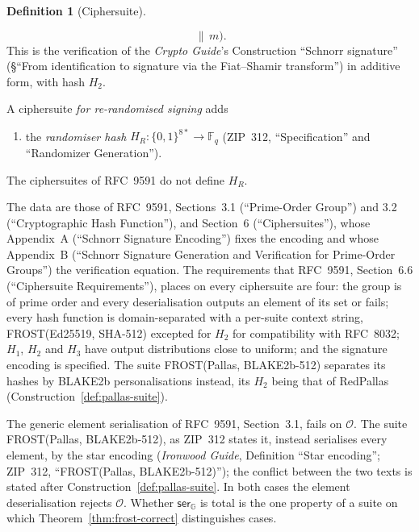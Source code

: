 \documentclass[11pt,a4paper]{article}
\theoremstyle{definition}
\newtheorem{definition}[theorem]{Definition}
\newcommand{\F}{\mathbb{F}}
\newcommand{\G}{\mathbb{G}}
\newcommand{\Fq}{\F_q}
\begin{document}
\begin{definition}[Ciphersuite]
\begin{enumerate}
\[      \,\|\, m\bigr) .
  \]
  This is the verification of the \emph{Crypto Guide}'s Construction
  ``Schnorr signature'' (\S``From identification to signature via the
  Fiat--Shamir transform'') in additive form, with hash \(H_2\).
\end{enumerate}
A ciphersuite \emph{for re-randomised signing} adds
\begin{enumerate}
\item[(f)] the \emph{randomiser hash} \(H_R \colon \{0,1\}^{8*} \to \Fq\)
  (ZIP~312, ``Specification'' and ``Randomizer Generation'').
\end{enumerate}
The ciphersuites of RFC~9591 do not define \(H_R\).
\end{definition}

The data are those of RFC~9591, Sections~3.1 (``Prime-Order Group'') and
3.2 (``Cryptographic Hash Function''), and Section~6 (``Ciphersuites''),
whose Appendix~A (``Schnorr Signature Encoding'') fixes the encoding and
whose Appendix~B (``Schnorr Signature Generation and Verification for
Prime-Order Groups'') the verification equation. The requirements that
RFC~9591, Section~6.6 (``Ciphersuite Requirements''), places on every
ciphersuite are four: the group is of prime order and every deserialisation
outputs an element of its set or fails; every hash function is
domain-separated with a per-suite context string, FROST(Ed25519, SHA-512)
excepted for \(H_2\) for compatibility with RFC~8032; \(H_1\), \(H_2\) and
\(H_3\) have output distributions close to uniform; and the signature
encoding is specified. The suite FROST(Pallas, BLAKE2b-512) separates its
hashes by BLAKE2b personalisations instead, its \(H_2\) being that of
RedPallas (Construction~\ref{def:pallas-suite}).

The generic element serialisation of RFC~9591, Section~3.1, fails on
\(\mathcal{O}\). The suite FROST(Pallas, BLAKE2b-512), as ZIP~312 states
it, instead serialises every element, by the star encoding (\emph{Ironwood
Guide}, Definition ``Star encoding''; ZIP~312, ``FROST(Pallas,
BLAKE2b-512)''); the conflict between the two texts is stated after
Construction~\ref{def:pallas-suite}. In both cases the element
deserialisation rejects \(\mathcal{O}\). Whether \(\mathsf{ser}_{\G}\) is
total is the one property of a suite on which
Theorem~\ref{thm:frost-correct} distinguishes cases.
\end{document}
